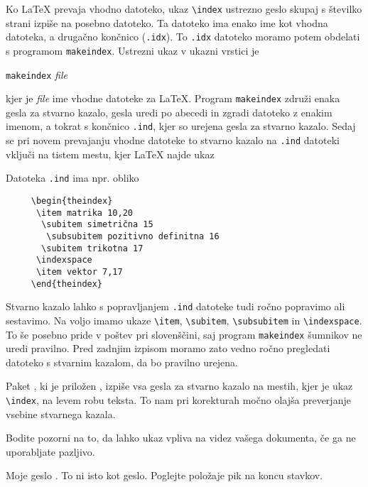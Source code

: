 Ko \LaTeX{} prevaja vhodno datoteko, ukaz \verb|\index| ustrezno geslo skupaj
s številko strani izpiše na posebno datoteko. Ta datoteko ima enako ime kot 
vhodna datoteka, a drugačno končnico  (\verb|.idx|). To 
\texttt{.idx} datoteko moramo potem obdelati s programom \texttt{makeindex}.
Ustrezni ukaz v ukazni vrstici je
\begin{lscommand}
  \texttt{makeindex} \emph{file}
\end{lscommand}
kjer je \emph{file} ime vhodne datoteke za \LaTeX{}.
Program \texttt{makeindex} združi enaka gesla za stvarno kazalo, gesla uredi po abecedi in zgradi datoteko 
z enakim imenom, a tokrat s končnico \texttt{.ind}, kjer so urejena gesla za stvarno kazalo. Sedaj se pri novem prevajanju 
vhodne datoteke to stvarno kazalo na \texttt{.ind} datoteki vključi na tistem mestu, kjer \LaTeX{} najde ukaz
\begin{lscommand}
\end{lscommand}

Datoteka \texttt{.ind} ima npr. obliko
\begin{verbatim}
     \begin{theindex}
      \item matrika 10,20
       \subitem simetrična 15
        \subsubitem pozitivno definitna 16
       \subitem trikotna 17
      \indexspace
      \item vektor 7,17
     \end{theindex}
\end{verbatim}
Stvarno kazalo lahko s popravljanjem \texttt{.ind} datoteke tudi ročno popravimo ali sestavimo. Na voljo 
imamo ukaze \verb|\item|, \verb|\subitem|, \verb|\subsubitem| in \verb|\indexspace|. To še posebno pride
v poštev pri slovenščini, saj program \texttt{makeindex} šumnikov ne uredi pravilno. Pred zadnjim izpisom 
moramo zato vedno ročno pregledati datoteko s stvarnim kazalom, da bo pravilno urejena.

Paket , ki je priložen \LaTeXe{}, izpiše vsa gesla za stvarno kazalo na mestih, kjer je ukaz 
\verb|\index|, 
na levem robu teksta. To nam pri korekturah močno olajša preverjanje vsebine stvarnega kazala.


Bodite pozorni na to, da lahko ukaz  vpliva na videz vašega dokumenta, če ga ne uporabljate pazljivo.

\begin{example}
Moje geslo . To ni isto
kot geslo. Poglejte
položaje pik na koncu stavkov.
\end{example}

